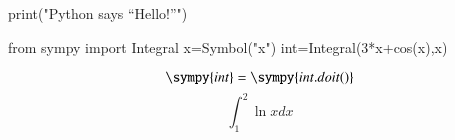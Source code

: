 \documentclass[]{article}
\begin{document}
\begin{pycode}
print("Python says ``Hello!''")
\end{pycode}
\begin{sympycode}
from sympy import Integral
x=Symbol("x")
int=Integral(3*x+cos(x),x)
\end{sympycode}
\[ \sympy{int}=\sympy{int.doit()} \]
\[\int_{1}^{2}{\ln{x}dx}\]


 
\end{document}
